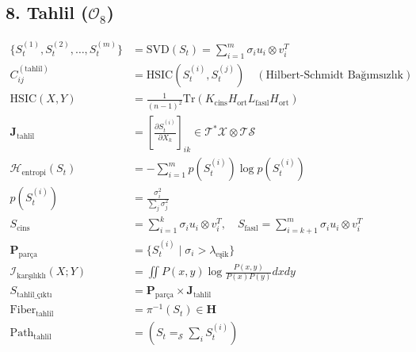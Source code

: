 \documentclass[11pt, a4paper]{article}
\begin{document}
\subsection{8. Tahlil ($\mathcal{O}_8$)}
\begin{align}
\{S_t^{(1)}, S_t^{(2)}, \dots, S_t^{(m)}\} &= \text{SVD}(S_t) = \sum_{i=1}^m \sigma_i u_i \otimes v_i^T \\
C_{ij}^{(\text{tahlil})} &= \text{HSIC}(S_t^{(i)}, S_t^{(j)}) \quad (\text{Hilbert-Schmidt Bağımsızlık}) \\
\text{HSIC}(X, Y) &= \frac{1}{(n-1)^2} \text{Tr}(K_{\text{cins}} H_{\text{ort}} L_{\text{fasıl}} H_{\text{ort}}) \\
\mathbf{J}_{\text{tahlil}} &= \left[ \frac{\partial S_t^{(i)}}{\partial X_k} \right]_{ik} \in \mathcal{T}^*\mathcal{X} \otimes \mathcal{T}\mathcal{S} \\
\mathcal{H}_{\text{entropi}}(S_t) &= -\sum_{i=1}^m p(S_t^{(i)}) \log p(S_t^{(i)}) \\
p(S_t^{(i)}) &= \frac{\sigma_i^2}{\sum_j \sigma_j^2} \\
S_{\text{cins}} &= \sum_{i=1}^k \sigma_i u_i \otimes v_i^T, \quad S_{\text{fasıl}} = \sum_{i=k+1}^m \sigma_i u_i \otimes v_i^T \\
\mathbf{P}_{\text{parça}} &= \{ S_t^{(i)} \mid \sigma_i > \lambda_{\text{eşik}} \} \\
\mathcal{I}_{\text{karşılıklı}}(X; Y) &= \iint P(x, y) \log \frac{P(x, y)}{P(x)P(y)} dx dy \\
S_{\text{tahlil\_çıktı}} &= \mathbf{P}_{\text{parça}} \times \mathbf{J}_{\text{tahlil}} \\
\text{Fiber}_{\text{tahlil}} &= \pi^{-1}(S_t) \in \mathbf{H} \\
\text{Path}_{\text{tahlil}} &= (S_t =_{\mathcal{S}} \sum_i S_t^{(i)})
\end{align}
\end{document}
